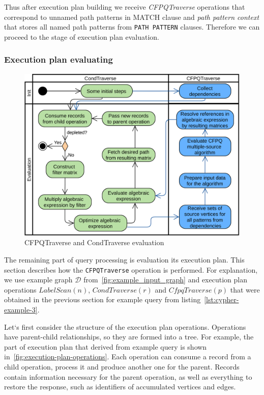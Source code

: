 Thus after execution plan building we receive \textit{CFPQTraverse} operations that correspond to unnamed path patterns in MATCH clause and \textit{path pattern context} that stores all named path patterns from \lstinline{PATH PATTERN} clauses. Therefore we can proceed to the stage of execution plan evaluation.


\subsubsection{Execution plan evaluating}
\label{subsubsec:execution-plan-evaluating}

\begin{figure}[h!]
  \centering
  \includegraphics[width=\linewidth]{pictures/execution-plan-evaluation.png}
  \caption{CFPQTraverse and CondTraverse evaluation}
  \label{fig:execution-plan-evaluation}
\end{figure}

The remaining part of query processing is evaluation its execution plan. This section describes how the \lstinline{CFPQTraverse} operation is performed. For explanation, we use example graph $\mathcal{D}$ from~\autoref{fig:example_input_graph} and execution plan operations $LabelScan(n)$, $CondTraverse(r)$ and $CfpqTraverse(p)$ that were obtained in the previous section for example query from listing~\autoref{lst:cypher-example-3}.

Let`s first consider the structure of the execution plan operations. Operations have parent-child relationships, so they are formed into a tree. For example, the part of execution plan that derived from example query is shown in~\autoref{fig:execution-plan-operations}. Each operation can consume a record from a child operation, process it and produce another one for the parent. Records contain information necessary for the parent operation, as well as everything to restore the response, such as identifiers of accumulated vertices and edges.

